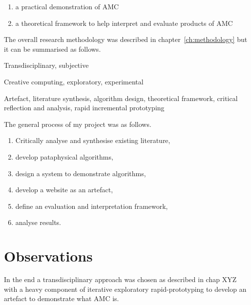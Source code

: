 \begin{enumerate}
  \item a practical demonstration of \ac{AMC}
  \item a theoretical framework to help interpret and evaluate products of \ac{AMC}
\end{enumerate}


The overall research methodology was described in chapter~\ref{ch:methodology} but it can be summarised as follows.

\begin{description}[leftmargin=3cm]
  \item [Epistemology] Transdisciplinary, subjective
  \item [Methodology] Creative computing, exploratory, experimental
  \item [Methods] Artefact, literature synthesis, algorithm design, theoretical framework, critical reflection and analysis, rapid incremental prototyping
\end{description}



The general process of my project was as follows.

\begin{enumerate}
  \item Critically analyse and synthesise existing literature,\sidepar{\textspiral~\ref{p:lit}}
  \item develop pataphysical algorithms,\sidepar{\textspiral~\ref{p:practice}}
  \item design a system to demonstrate algorithms,\sidepar{\textspiral~\ref{p:practice}}
  \item develop a website as an artefact,\sidepar{\textspiral~\ref{p:practice}}
  \item define an evaluation and interpretation framework,\sidepar{\textspiral~\ref{p:theory}}
  \item analyse results.\sidepar{\textspiral~\ref{p:analysis}}
\end{enumerate}

\section{Observations}

 In the end a transdisciplinary approach was chosen as described in chap XYZ with a heavy component of iterative exploratory rapid-prototyping to develop an artefact to demonstrate what \ac{AMC} is. 

